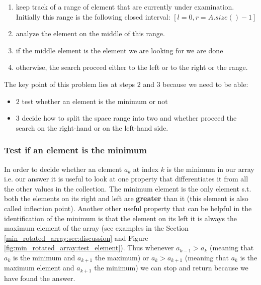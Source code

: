 \begin{enumerate}
	\item keep track of a range of element that are currently under examination. Initially this range is the following closed interval: $[l=0, r=A.size()-1]$
	\item analyze the element on the middle of this range.
	\item if the middle element is the element we are looking for we are done
	\item otherwise, the search proceed either to the left or to the right or the range. 
\end{enumerate}

The key point of this problem lies at steps $2$ and $3$ because we need to be able:
\begin{itemize}
	\item $2$ test whether an element is the minimum or not
	\item $3$ decide how to split the space range into two and whether proceed the search on the right-hand or on the left-hand side.
\end{itemize}

\subsubsection{Test if an element is the minimum}
In order to decide whether an element $a_k$ at index $k$ is the minimum in our array i.e. our answer it is useful to look at one property that differentiates it from all the other values in the collection. The minimum element is the only element s.t. both the elements on its right and left are \textbf{greater} than it (this element is also called inflection point). Another other useful property that can be helpful in the identification of the minimum is that the element on its left it is always the maximum element of the array (see examples in the Section \ref{min_rotated_array:sec:discussion} and Figure \ref{fig:min_rotated_array:test_element}). Thus whenever $a_{k-1} > a_{k}$ (meaning that $a_k$ is the minimum and $a_{k+1}$ the maximum) or $a_{k} > a_{k+1}$ (meaning that $a_k$ is the maximum element and $a_{k+1}$ the minimum) we can stop and return because we have found the answer. 

